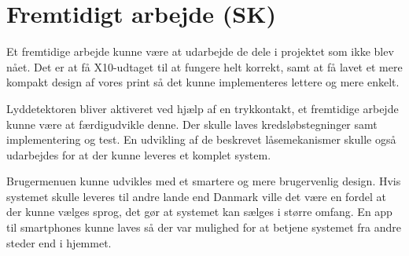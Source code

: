 \chapter{Fremtidigt arbejde (SK)}

Et fremtidige arbejde kunne være at udarbejde de dele i projektet som ikke blev nået. Det er at få X10-udtaget til at fungere helt korrekt, samt at få lavet et mere kompakt design af vores print så det kunne implementeres lettere og mere enkelt. 

Lyddetektoren bliver aktiveret ved hjælp af en trykkontakt, et fremtidige arbejde kunne være at færdigudvikle denne. Der skulle laves kredsløbstegninger samt implementering og test. En udvikling af de beskrevet låsemekanismer skulle også udarbejdes for at der kunne leveres et komplet system.

Brugermenuen kunne udvikles med et smartere og mere brugervenlig design. Hvis systemet skulle leveres til andre lande end Danmark ville det være en fordel at der kunne vælges sprog, det gør at systemet kan sælges i større omfang. En app til smartphones kunne laves så der var mulighed for at betjene systemet fra andre steder end i hjemmet.